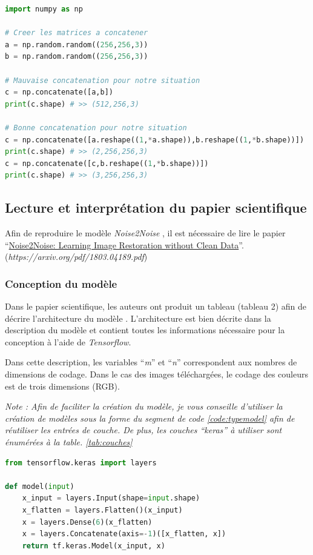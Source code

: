 \documentclass{article}
\begin{document}
\bigbreak
\begin{lstlisting}[language=Python, caption={Exemple d'utilisation de la méthode \textit{numpy.concatenate}}, label={code:concatenate}]
import numpy as np

# Creer les matrices a concatener
a = np.random.random((256,256,3))
b = np.random.random((256,256,3))

# Mauvaise concatenation pour notre situation
c = np.concatenate([a,b])
print(c.shape) # >> (512,256,3)

# Bonne concatenation pour notre situation
c = np.concatenate([a.reshape((1,*a.shape)),b.reshape((1,*b.shape))])
print(c.shape) # >> (2,256,256,3)
c = np.concatenate([c,b.reshape((1,*b.shape))])
print(c.shape) # >> (3,256,256,3)
\end{lstlisting}

\subsection{Lecture et interprétation du papier scientifique}
Afin de reproduire le modèle \textit{Noise2Noise} \citep{Noise2Noise}, il est nécessaire de lire le papier ``\href{https://arxiv.org/pdf/1803.04189.pdf}{Noise2Noise: Learning Image Restoration without Clean Data}''.
\bigbreak
(\textit{https://arxiv.org/pdf/1803.04189.pdf})

\subsubsection{Conception du modèle}
Dans le papier scientifique, les auteurs ont produit un tableau (tableau 2) afin de décrire l'architecture du modèle \citep{Noise2Noise}. L'architecture est bien décrite dans la description du modèle et contient toutes les informations nécessaire pour la conception à l'aide de \textit{Tensorflow}.

\bigbreak
Dans cette description, les variables ``\textit{m}'' et ``\textit{n}'' correspondent aux nombres de dimensions de codage. Dans le cas des images téléchargées, le codage des couleurs est de trois dimensions (RGB).

\bigbreak
\textit{Note : Afin de faciliter la création du modèle, je vous conseille d'utiliser la création de modèles sous la forme du segment de code \ref{code:typemodel} afin de réutiliser les entrées de couche. De plus, les couches ``keras'' à utiliser sont énumérées à la table. \ref{tab:couches} }

\bigbreak
\begin{lstlisting}[language=Python, caption={Création de modèle pour la réutilisation d'entrée de couche}, label={code:typemodel}]
from tensorflow.keras import layers

def model(input)
    x_input = layers.Input(shape=input.shape)
    x_flatten = layers.Flatten()(x_input)
    x = layers.Dense(6)(x_flatten)
    x = layers.Concatenate(axis=-1)([x_flatten, x])
    return tf.keras.Model(x_input, x)
\end{lstlisting}
\end{document}
